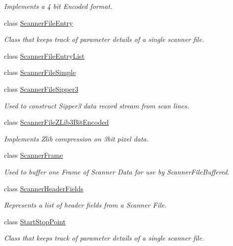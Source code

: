 \begin{DoxyCompactItemize}
\begin{DoxyCompactList}\small\item\em Implements a 4 bit Encoded format. \end{DoxyCompactList}\item 
class \hyperlink{class_k_k_l_s_c_1_1_scanner_file_entry}{Scanner\+File\+Entry}
\begin{DoxyCompactList}\small\item\em Class that keeps track of parameter details of a single scanner file. \end{DoxyCompactList}\item 
class \hyperlink{class_k_k_l_s_c_1_1_scanner_file_entry_list}{Scanner\+File\+Entry\+List}
\item 
class \hyperlink{class_k_k_l_s_c_1_1_scanner_file_simple}{Scanner\+File\+Simple}
\item 
class \hyperlink{class_k_k_l_s_c_1_1_scanner_file_sipper3}{Scanner\+File\+Sipper3}
\begin{DoxyCompactList}\small\item\em Used to construct Sipper3 data record stream from scan lines. \end{DoxyCompactList}\item 
class \hyperlink{class_k_k_l_s_c_1_1_scanner_file_z_lib3_bit_encoded}{Scanner\+File\+Z\+Lib3\+Bit\+Encoded}
\begin{DoxyCompactList}\small\item\em Implements Zlib compression on 3bit pixel data. \end{DoxyCompactList}\item 
class \hyperlink{class_k_k_l_s_c_1_1_scanner_frame}{Scanner\+Frame}
\begin{DoxyCompactList}\small\item\em Used to buffer one Frame of Scanner Data for use by \textquotesingle{}Scanner\+File\+Buffered\textquotesingle{}. \end{DoxyCompactList}\item 
class \hyperlink{class_k_k_l_s_c_1_1_scanner_header_fields}{Scanner\+Header\+Fields}
\begin{DoxyCompactList}\small\item\em Represents a list of header fields from a Scanner File. \end{DoxyCompactList}\item 
class \hyperlink{class_k_k_l_s_c_1_1_start_stop_point}{Start\+Stop\+Point}
\begin{DoxyCompactList}\small\item\em Class that keeps track of parameter details of a single scanner file. \end{DoxyCompactList}\item 

\end{DoxyCompactItemize}
